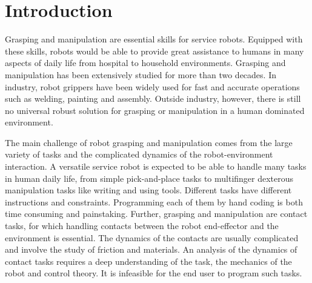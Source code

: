 \chapter{Introduction}
\label{cha1}

\setcounter{page}{1}
Grasping and manipulation are essential skills for service robots. Equipped with these skills, robots would be able to provide great assistance to humans in many aspects of daily life from hospital to household environments. Grasping and manipulation has been extensively studied for more than two decades. In industry, robot grippers have been widely used for fast and accurate operations such as welding, painting and assembly. Outside industry, however, there is still no universal robust solution for grasping or manipulation in a human dominated environment.

The main challenge of robot grasping and manipulation comes from the large variety of tasks and the complicated dynamics of the robot-environment interaction. A versatile service robot is expected to be able to handle many tasks in human daily life, from simple pick-and-place tasks to multifinger dexterous manipulation tasks like writing and using tools. Different tasks have different instructions and constraints. Programming each of them by hand coding is both time consuming and painstaking. Further, grasping and manipulation are contact tasks, for which handling contacts between the robot end-effector and the environment is essential. The dynamics of the contacts are usually complicated and involve the study of friction and materials. An analysis of the dynamics of contact tasks requires a deep understanding of the task, the mechanics of the robot and control theory. It is infeasible for the end user to program such tasks.

